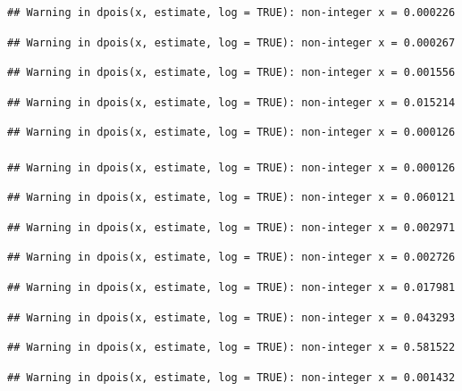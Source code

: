 \documentclass[]{article}
\begin{document}
\begin{verbatim}
## Warning in dpois(x, estimate, log = TRUE): non-integer x = 0.000226
\end{verbatim}

\begin{verbatim}
## Warning in dpois(x, estimate, log = TRUE): non-integer x = 0.000267
\end{verbatim}

\begin{verbatim}
## Warning in dpois(x, estimate, log = TRUE): non-integer x = 0.001556
\end{verbatim}

\begin{verbatim}
## Warning in dpois(x, estimate, log = TRUE): non-integer x = 0.015214
\end{verbatim}

\begin{verbatim}
## Warning in dpois(x, estimate, log = TRUE): non-integer x = 0.000126

## Warning in dpois(x, estimate, log = TRUE): non-integer x = 0.000126
\end{verbatim}

\begin{verbatim}
## Warning in dpois(x, estimate, log = TRUE): non-integer x = 0.060121
\end{verbatim}

\begin{verbatim}
## Warning in dpois(x, estimate, log = TRUE): non-integer x = 0.002971
\end{verbatim}

\begin{verbatim}
## Warning in dpois(x, estimate, log = TRUE): non-integer x = 0.002726
\end{verbatim}

\begin{verbatim}
## Warning in dpois(x, estimate, log = TRUE): non-integer x = 0.017981
\end{verbatim}

\begin{verbatim}
## Warning in dpois(x, estimate, log = TRUE): non-integer x = 0.043293
\end{verbatim}

\begin{verbatim}
## Warning in dpois(x, estimate, log = TRUE): non-integer x = 0.581522
\end{verbatim}

\begin{verbatim}
## Warning in dpois(x, estimate, log = TRUE): non-integer x = 0.001432
\end{verbatim}
\end{document}
